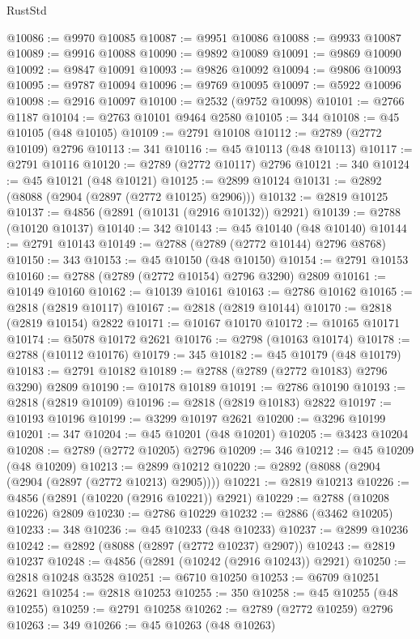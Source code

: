 \begin{lexlean}{RustStd}
\begin{coremodule}
@10086 := @9970 @10085
@10087 := @9951 @10086
@10088 := @9933 @10087
@10089 := @9916 @10088
@10090 := @9892 @10089
@10091 := @9869 @10090
@10092 := @9847 @10091
@10093 := @9826 @10092
@10094 := @9806 @10093
@10095 := @9787 @10094
@10096 := @9769 @10095
@10097 := @5922 @10096
@10098 := @2916 @10097
@10100 := @2532 (@9752 @10098)
@10101 := @2766 @1187
@10104 := @2763 @10101 @9464 @2580
@10105 := 344
@10108 := @45 @10105 (@48 @10105)
@10109 := @2791 @10108
@10112 := @2789 (@2772 @10109) @2796
@10113 := 341
@10116 := @45 @10113 (@48 @10113)
@10117 := @2791 @10116
@10120 := @2789 (@2772 @10117) @2796
@10121 := 340
@10124 := @45 @10121 (@48 @10121)
@10125 := @2899 @10124
@10131 := @2892 (@8088 (@2904 (@2897 (@2772 @10125) @2906)))
@10132 := @2819 @10125
@10137 := @4856 (@2891 (@10131 (@2916 @10132)) @2921)
@10139 := @2788 (@10120 @10137)
@10140 := 342
@10143 := @45 @10140 (@48 @10140)
@10144 := @2791 @10143
@10149 := @2788 (@2789 (@2772 @10144) @2796 @8768)
@10150 := 343
@10153 := @45 @10150 (@48 @10150)
@10154 := @2791 @10153
@10160 := @2788 (@2789 (@2772 @10154) @2796 @3290) @2809
@10161 := @10149 @10160
@10162 := @10139 @10161
@10163 := @2786 @10162
@10165 := @2818 (@2819 @10117)
@10167 := @2818 (@2819 @10144)
@10170 := @2818 (@2819 @10154) @2822
@10171 := @10167 @10170
@10172 := @10165 @10171
@10174 := @5078 @10172 @2621
@10176 := @2798 (@10163 @10174)
@10178 := @2788 (@10112 @10176)
@10179 := 345
@10182 := @45 @10179 (@48 @10179)
@10183 := @2791 @10182
@10189 := @2788 (@2789 (@2772 @10183) @2796 @3290) @2809
@10190 := @10178 @10189
@10191 := @2786 @10190
@10193 := @2818 (@2819 @10109)
@10196 := @2818 (@2819 @10183) @2822
@10197 := @10193 @10196
@10199 := @3299 @10197 @2621
@10200 := @3296 @10199
@10201 := 347
@10204 := @45 @10201 (@48 @10201)
@10205 := @3423 @10204
@10208 := @2789 (@2772 @10205) @2796
@10209 := 346
@10212 := @45 @10209 (@48 @10209)
@10213 := @2899 @10212
@10220 := @2892 (@8088 (@2904 (@2904 (@2897 (@2772 @10213) @2905))))
@10221 := @2819 @10213
@10226 := @4856 (@2891 (@10220 (@2916 @10221)) @2921)
@10229 := @2788 (@10208 @10226) @2809
@10230 := @2786 @10229
@10232 := @2886 (@3462 @10205)
@10233 := 348
@10236 := @45 @10233 (@48 @10233)
@10237 := @2899 @10236
@10242 := @2892 (@8088 (@2897 (@2772 @10237) @2907))
@10243 := @2819 @10237
@10248 := @4856 (@2891 (@10242 (@2916 @10243)) @2921)
@10250 := @2818 @10248 @3528
@10251 := @6710 @10250
@10253 := @6709 @10251 @2621
@10254 := @2818 @10253
@10255 := 350
@10258 := @45 @10255 (@48 @10255)
@10259 := @2791 @10258
@10262 := @2789 (@2772 @10259) @2796
@10263 := 349
@10266 := @45 @10263 (@48 @10263)

\end{coremodule}
\end{lexlean}
